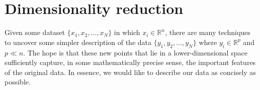 \documentclass[11pt]{article}
\begin{document}




\section{Dimensionality reduction}

Given some dataset $\{x_1, x_2, ..., x_N\}$ in which $x_i \in \mathbb{R}^n$, there are many techniques to uncover some simpler description of the data $\{y_1, y_2, ..., y_N\}$ where $y_i \in \mathbb{R}^p$ and $p \ll n$. The hope is that these new points that lie in a lower-dimensional space sufficiently capture, in some mathematically precise sense, the important features of the original data. In essence, we would like to describe our data as concisely as possible.
\end{document}
